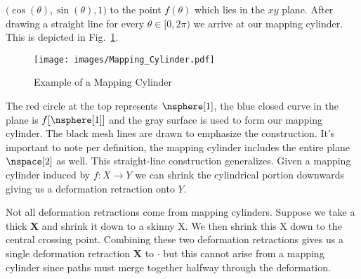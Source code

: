 \documentclass{book}                                                           %
\begin{document}
                $\big(\cos(\theta),\sin(\theta),1\big)$ to the point $f(\theta)$
                which lies in the $xy$ plane. After drawing a straight line for
                every $\theta\in[0,2\pi)$ we arrive at our mapping cylinder.
                This is depicted in Fig.~\ref{fig:Ex_Mapping_Cylinder}.
                \begin{figure}[H]
                    \centering
                    \captionsetup{type=figure}
                    \texttt{[image: images/Mapping\_Cylinder.pdf]}
                    \caption{Example of a Mapping Cylinder}
                    \label{fig:Ex_Mapping_Cylinder}
                \end{figure}
                The red circle at the top represents $\nsphere[1]$, the blue
                closed curve in the plane is $f[\nsphere[1]]$ and the gray
                surface is used to form our mapping cylinder. The black mesh
                lines are drawn to emphasize the construction. It's important to
                note per definition, the mapping cylinder includes the entire
                plane $\nspace[2]$ as well. This straight-line construction
                generalizes. Given a mapping cylinder induced by
                $f:X\rightarrow{Y}$ we can shrink the cylindrical portion
                downwards giving us a deformation retraction onto $Y$.
                \par\hfill\par
                Not all deformation retractions come from mapping cylinders.
                Suppose we take a thick $\textbf{X}$ and shrink it down to a
                skinny X. We then shrink this X down to the central crossing
                point. Combining these two deformation retractions gives us a
                single deformation retraction $\textbf{X}$ to $\cdot$ but this
                cannot arise from a mapping cylinder since paths must merge
                together halfway through the deformation.
\end{document}
